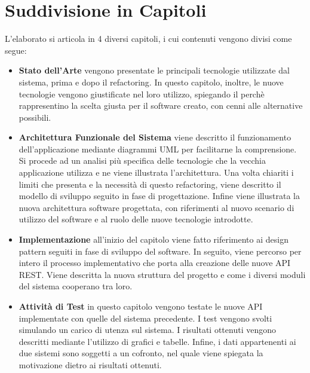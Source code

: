 \section*{Suddivisione in Capitoli}
L'elaborato si articola in 4 diversi capitoli, i cui contenuti vengono divisi come segue:
\begin{itemize}
    \item \textbf{Stato dell'Arte} vengono presentate le principali tecnologie utilizzate dal sistema, prima e dopo il refactoring. In questo capitolo, inoltre, le nuove tecnologie vengono giustificate nel loro utilizzo, spiegando il perchè rappresentino la scelta giusta per il software creato, con cenni alle alternative possibili.
    \item \textbf{Architettura Funzionale del Sistema} viene descritto il funzionamento dell'applicazione mediante diagrammi UML per facilitarne la comprensione. Si procede ad un analisi più specifica delle tecnologie che la vecchia applicazione utilizza e ne viene illustrata l'architettura. Una volta chiariti i limiti che presenta e la necessità di questo refactoring, viene descritto il modello di sviluppo seguito in fase di progettazione. Infine viene illustrata la nuova architettura software progettata, con riferimenti al nuovo scenario di utilizzo del software e al ruolo delle nuove tecnologie introdotte.
    \item \textbf{Implementazione} all'inizio del capitolo viene fatto riferimento ai design pattern seguiti in fase di sviluppo del software. In seguito, viene percorso per intero il processo implementativo che porta alla creazione delle nuove API REST. Viene descritta la nuova struttura del progetto e come i diversi moduli del sistema cooperano tra loro.
    \item \textbf{Attività di Test} in questo capitolo vengono testate le nuove API implementate con quelle del sistema precedente. I test vengono svolti simulando un carico di utenza sul sistema. I risultati ottenuti vengono descritti mediante l'utilizzo di grafici e tabelle. Infine, i dati appartenenti ai due sistemi sono soggetti a un cofronto, nel quale viene spiegata la motivazione dietro ai risultati ottenuti.
\end{itemize} 